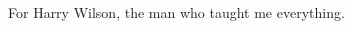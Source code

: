 \cleardoublepage
\thispagestyle{empty} %

\vspace*{8cm} 

\hfill
\begin{parbox}{0.6\textwidth}{
\begin{flushright}

For Harry Wilson, the man who taught me everything.

\end{flushright}}
\end{parbox}


